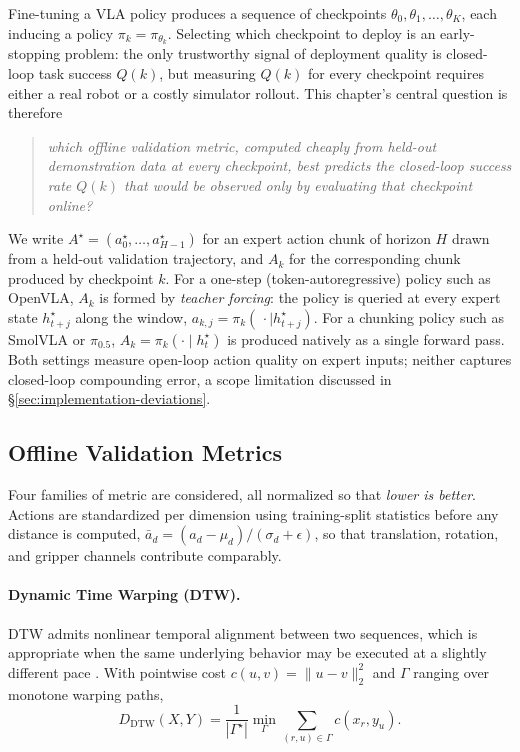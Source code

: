 \documentclass[11pt]{article}
\numberwithin{equation}{section}
\numberwithin{table}{section}
\numberwithin{figure}{section}
\begin{document}
Fine-tuning a VLA policy produces a sequence of checkpoints $\theta_0,\theta_1,\dots,\theta_K$, each
inducing a policy $\pi_k=\pi_{\theta_k}$. Selecting which checkpoint to deploy is an early-stopping
problem: the only trustworthy signal of deployment quality is closed-loop task success $Q(k)$, but
measuring $Q(k)$ for every checkpoint requires either a real robot or a costly simulator rollout. This
chapter's central question is therefore
\begin{quote}
  \emph{which offline validation metric, computed cheaply from held-out demonstration data at every
  checkpoint, best predicts the closed-loop success rate $Q(k)$ that would be observed only by
  evaluating that checkpoint online?}
\end{quote}
We write $A^\star=(a^\star_0,\dots,a^\star_{H-1})$ for an expert action chunk of horizon $H$ drawn from
a held-out validation trajectory, and $A_k$ for the corresponding chunk produced by checkpoint $k$. For
a one-step (token-autoregressive) policy such as OpenVLA, $A_k$ is formed by \emph{teacher forcing}: the
policy is queried at every expert state $h^\star_{t+j}$ along the window, $a_{k,j}=\pi_k(\,\cdot\mid
h^\star_{t+j})$. For a chunking policy such as SmolVLA or $\pi_{0.5}$, $A_k=\pi_k(\cdot\mid h^\star_t)$
is produced natively as a single forward pass. Both settings measure open-loop action quality on expert
inputs; neither captures closed-loop compounding error, a scope limitation discussed in
\S\ref{sec:implementation-deviations}.

\subsection{Offline Validation Metrics}
\label{sec:method-metrics}

Four families of metric are considered, all normalized so that \emph{lower is better}. Actions are
standardized per dimension using training-split statistics before any distance is computed,
$\bar a_d=(a_d-\mu_d)/(\sigma_d+\epsilon)$, so that translation, rotation, and gripper channels
contribute comparably.

\paragraph{Dynamic Time Warping (DTW).} DTW admits nonlinear temporal alignment between two sequences,
which is appropriate when the same underlying behavior may be executed at a slightly different pace
\cite{sakoe1978dtw}. With pointwise cost $c(u,v)=\lVert u-v\rVert_2^2$ and $\Gamma$ ranging over
monotone warping paths,
\begin{equation}
  D_{\mathrm{DTW}}(X,Y) = \frac{1}{|\Gamma^\star|}\min_{\Gamma}\sum_{(r,u)\in\Gamma} c(x_r,y_u).
  \label{eq:dtw}
\end{equation}
\end{document}

